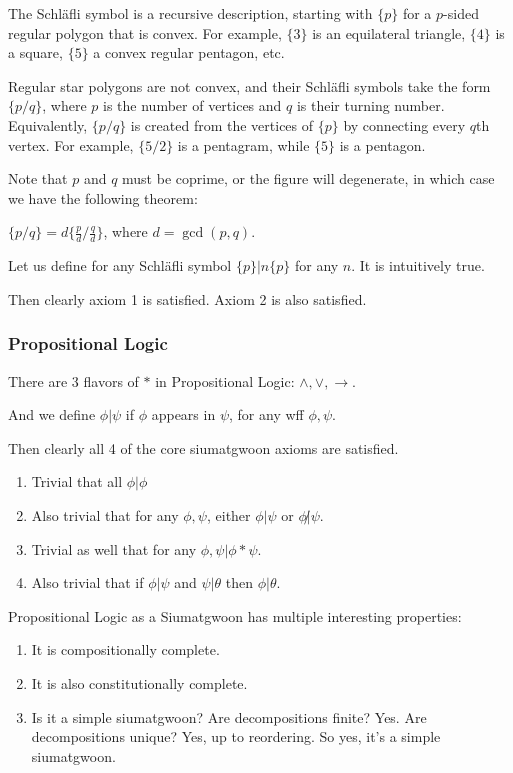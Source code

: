 The Schläfli symbol is a recursive description, starting with $\{p\}$ for a $p$-sided regular polygon that is convex. For example, $\{3\}$ is an equilateral triangle, $\{4\}$ is a square, $\{5\}$ a convex regular pentagon, etc.

Regular star polygons are not convex, and their Schläfli symbols take the form $\{p/q\}$, where $p$ is the number of vertices and $q$ is their turning number. Equivalently, $\{p/q\}$ is created from the vertices of $\{p\}$ by connecting every $q$th vertex. For example, $\{5/2\}$ is a pentagram, while $\{5\}$ is a pentagon.

Note that $p$ and $q$ must be coprime, or the figure will degenerate, in which case we have the following theorem:

$\{p/q\}=d\{ \frac{p}{d} / \frac{q}{d} \}$, where $d=\gcd(p,q)$.

Let us define for any Schläfli symbol $\{p\} | n\{p\}$ for any $n$. It is intuitively true.

Then clearly axiom 1 is satisfied. Axiom 2 is also satisfied.

\subsubsection{Propositional Logic}

There are 3 flavors of $*$ in Propositional Logic: $\wedge, \vee, \rightarrow$. 

And we define $\phi | \psi$ if $\phi$ appears in $\psi$, for any wff $\phi, \psi$.

Then clearly all 4 of the core siumatgwoon axioms are satisfied. 

\begin{enumerate}
\item Trivial that all $\phi | \phi$
\item Also trivial that for any $\phi, \psi$, either $\phi|\psi$ or $\phi\not|\psi$.
\item Trivial as well that for any $\phi,\psi | \phi * \psi$.
\item Also trivial that if $\phi | \psi$ and $\psi | \theta$ then $\phi | \theta$.
\end{enumerate}

Propositional Logic as a Siumatgwoon has multiple interesting properties: 

\begin{enumerate}
\item It is compositionally complete. 
\item It is also constitutionally complete. 
\item Is it a simple siumatgwoon? Are decompositions finite? Yes. Are decompositions unique? Yes, up to reordering. So yes, it's a simple siumatgwoon.


\end{enumerate}

